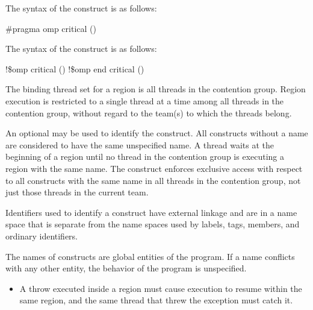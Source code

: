 \syntax
\ccppspecificstart
The syntax of the  construct is as follows:

\begin{boxedcode}
\#pragma omp critical \plc{[}()\plc{] new-line}
\end{boxedcode}
\ccppspecificend

\fortranspecificstart
The syntax of the  construct is as follows:

\begin{boxedcode}
!\$omp critical \plc{[}()\plc{]}
!\$omp end critical \plc{[}()\plc{]}
\end{boxedcode}
\fortranspecificend

\binding
The binding thread set for a  region is all threads in the contention group. 
Region execution is restricted to a single thread at a time among all threads in the 
contention group, without regard to the team(s) to which the threads belong.

\descr
An optional  may be used to identify the  construct. All  
constructs without a name are considered to have the same unspecified name. A thread 
waits at the beginning of a  region until no thread in the contention group is 
executing a  region with the same name. The  construct enforces 
exclusive access with respect to all  constructs with the same name in all 
threads in the contention group, not just those threads in the current team. 

\ccppspecificstart
Identifiers used to identify a  construct have external linkage and are in a 
name space that is separate from the name spaces used by labels, tags, members, and 
ordinary identifiers.
\ccppspecificend

\fortranspecificstart
The names of  constructs are global entities of the program. If a name 
conflicts with any other entity, the behavior of the program is unspecified.
\fortranspecificend

\restrictions
\cppspecificstart
\begin{itemize}
\item A throw executed inside a  region must cause execution to resume within 
the same  region, and the same thread that threw the exception must catch 
it.
\end{itemize}
\cppspecificend

